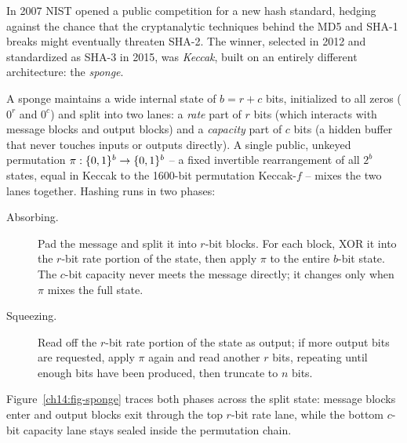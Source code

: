 In 2007 NIST opened a public competition for a new hash standard, hedging against the chance that the cryptanalytic techniques behind the MD5 and SHA-1 breaks might eventually threaten SHA-2. The winner, selected in 2012 and standardized as SHA-3 in 2015, was \emph{Keccak}, built on an entirely different architecture: the \emph{sponge}.

A sponge maintains a wide internal state of $b = r + c$ bits, initialized to all zeros ($0^r$ and $0^c$) and split into two lanes: a \emph{rate} part of $r$ bits (which interacts with message blocks and output blocks) and a \emph{capacity} part of $c$ bits (a hidden buffer that never touches inputs or outputs directly). A single public, unkeyed permutation $\pi : \{0,1\}^{b} \to \{0,1\}^{b}$ -- a fixed invertible rearrangement of all $2^{b}$ states, equal in Keccak to the 1600-bit permutation Keccak-$f$ -- mixes the two lanes together. Hashing runs in two phases:

\begin{description}
  \item[Absorbing.] Pad the message and split it into $r$-bit blocks. For each block, XOR it into the $r$-bit rate portion of the state, then apply $\pi$ to the entire $b$-bit state. The $c$-bit capacity never meets the message directly; it changes only when $\pi$ mixes the full state.
  \item[Squeezing.] Read off the $r$-bit rate portion of the state as output; if more output bits are requested, apply $\pi$ again and read another $r$ bits, repeating until enough bits have been produced, then truncate to $n$ bits.
\end{description}

Figure~\ref{ch14:fig-sponge} traces both phases across the split state: message blocks enter and output blocks exit through the top $r$-bit rate lane, while the bottom $c$-bit capacity lane stays sealed inside the permutation chain.

